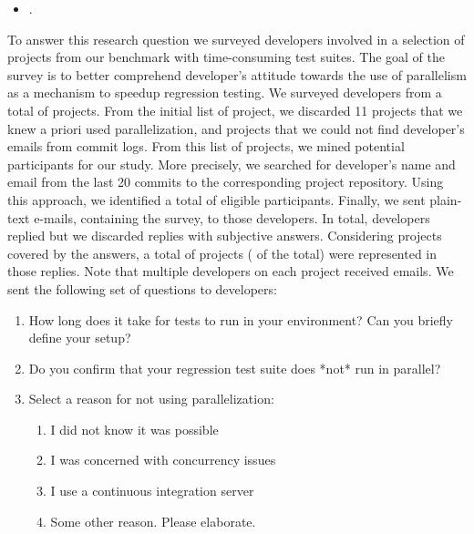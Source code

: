 \begin{itemize}
	\item \numRQAdoptionTwo{}. \textbf{\RQAdoptionTwo{}}
\end{itemize}

To answer this research question we surveyed developers involved in a
selection of projects from our benchmark with time-consuming test
suites.  The goal of the survey is to better comprehend developer's
attitude towards the use of parallelism as a mechanism to speedup
regression testing.  We surveyed developers from a total of
\emailsProjects{} projects.  From the initial list of \numMedLong{}
project, we discarded 11 projects that we knew a priori used
parallelization, and \discartedProjects{} projects that we could not find
developer's emails from commit logs.  From this list of projects, we
mined potential participants for our study.  More precisely, we
searched for developer's name and email from the last 20 commits to
the corresponding project repository.  Using this approach, we
identified a total of \emailsSent{} eligible participants.  Finally,
we sent plain-text e-mails, containing the survey, to those developers.  In
total, \emailsAnswered{} developers replied but we discarded
\emailsFalseAnswers{} replies with subjective answers.  Considering
projects covered by the answers, a total of \emailsProjectsAnswered{}
projects (\percEmailsProjectsAnswered{} of the total) were represented
in those replies.  Note that multiple developers on each project
received emails.  We sent the following set of questions to
developers:

\begin{enumerate}
\item How long does it take for tests to run in your environment? Can
  you briefly define your setup?
\item Do you confirm that your regression test suite does *not* run in parallel?
\item\label{questionThree} Select a reason for not using parallelization:
  \begin{enumerate}[label=\alph*)]
  \item I did not know it was possible
  \item I was concerned with concurrency issues
  \item I use a continuous integration server
  \item Some other reason. Please elaborate.
  \end{enumerate}
\end{enumerate}

